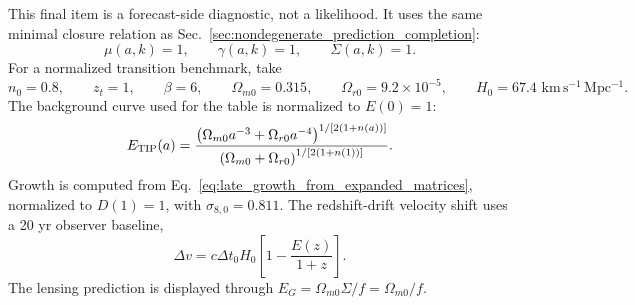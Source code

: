 \documentclass[aps,prd,reprint,nofootinbib,superscriptaddress,longbibliography]{revtex4-2}
\newcommand{\kmsMpc}{\,\mathrm{km\,s^{-1}\,Mpc^{-1}}}
\begin{document}
This final item is a forecast-side diagnostic, not a likelihood. It uses the same minimal closure relation as Sec.~\ref{sec:nondegenerate_prediction_completion}:
\begin{equation}
  \mu(a,k)=1,
  \qquad
  \gamma(a,k)=1,
  \qquad
  \Sigma(a,k)=1 .
\end{equation}
For a normalized transition benchmark, take
\begin{equation}
  n_0=0.8,
  \qquad
  z_t=1,
  \qquad
  \beta=6,
  \qquad
  \Omega_{m0}=0.315,
  \qquad
  \Omega_{r0}=9.2\times10^{-5},
  \qquad
  H_0=67.4\,\kmsMpc .
\end{equation}
The background curve used for the table is normalized to $E(0)=1$:
\begin{equation}
  E_{\rm TIP}(a)=\frac{\left(\Omega_{m0}a^{-3}+\Omega_{r0}a^{-4}\right)^{1/[2(1+n(a))]}}
  {\left(\Omega_{m0}+\Omega_{r0}\right)^{1/[2(1+n(1))]}} .
  \label{eq:normalized_forecast_E}
\end{equation}
Growth is computed from Eq.~\eqref{eq:late_growth_from_expanded_matrices}, normalized to $D(1)=1$, with $\sigma_{8,0}=0.811$. The redshift-drift velocity shift uses a 20 yr observer baseline,
\begin{equation}
  \Delta v=c\Delta t_0H_0\left[1-\frac{E(z)}{1+z}\right].
\end{equation}
The lensing prediction is displayed through $E_G=\Omega_{m0}\Sigma/f=\Omega_{m0}/f$.
\end{document}
